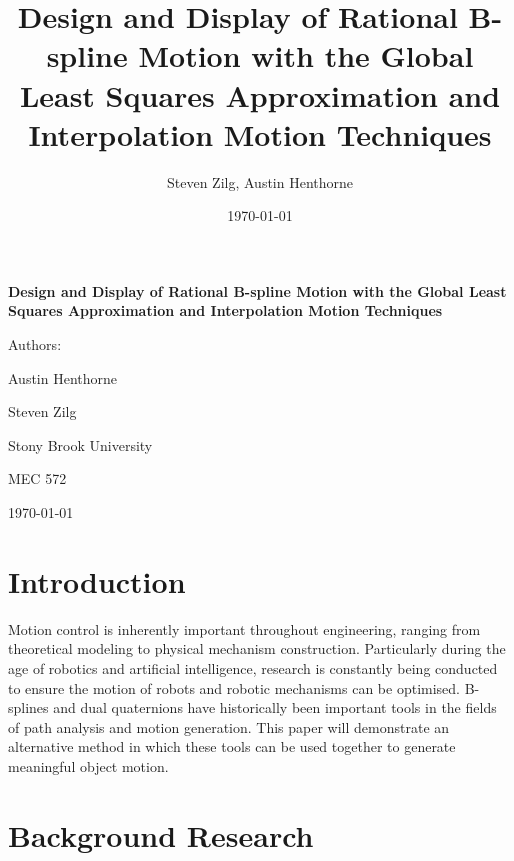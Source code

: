 \documentclass[11pt]{article}
\title{Design and Display of Rational B-spline Motion with the Global Least Squares Approximation and Interpolation Motion Techniques}
\author{ Steven Zilg, Austin Henthorne }
\date{\today}
\begin{document}
\begin{titlepage}
\centering
\LARGE{\textbf{Design and Display of Rational B-spline Motion with the Global Least Squares Approximation and Interpolation Motion Techniques}}

\vspace{2cm}
\Large{Authors:}

\Large{Austin Henthorne}

\Large{Steven Zilg}

\vfill

\Large{Stony Brook University}

\Large{ MEC 572}

\Large{\today}
\end{titlepage}

\newpage
\section{Introduction}

Motion control is inherently important throughout engineering, ranging from theoretical modeling to physical mechanism construction. Particularly during the age of robotics and artificial intelligence, research is constantly being conducted to ensure the motion of robots and robotic mechanisms can be optimised. B-splines and dual quaternions have historically been important tools in the fields of path analysis and motion generation. This paper will demonstrate an alternative method in which these tools can be used together to generate meaningful object motion.

\newpage
\section{Background Research}
\end{document}
